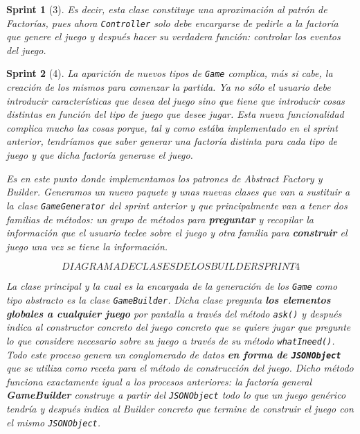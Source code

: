 \documentclass[12pt,a4paper,openright]{book}
\theoremstyle{break}
\newtheorem*{sprint}{Sprint}
\begin{document}
\begin{sprint}[3]
Es decir, esta clase constituye una aproximación al patrón de Factorías, pues ahora \texttt{Controller} solo debe encargarse de pedirle a la factoría que genere el juego y después hacer su verdadera función: controlar los eventos del juego.
\end{sprint}

\begin{sprint}[4]
La aparición de nuevos tipos de \texttt{Game} complica, más si cabe, la creación de los mismos para comenzar la partida. Ya no sólo el usuario debe introducir características que desea del juego sino que tiene que introducir cosas distintas en función del tipo de juego que desee jugar. Esta nueva funcionalidad complica mucho las cosas porque, tal y como estába implementado en el sprint anterior, tendríamos que saber generar una factoría distinta para cada tipo de juego y que dicha factoría generase el juego.

Es en este punto donde implementamos los patrones de \textit{Abstract Factory} y \textit{Builder}. Generamos un nuevo paquete y unas nuevas clases que van a sustituir a la clase \texttt{GameGenerator} del sprint anterior y que principalmente van a tener dos familias de métodos: un grupo de métodos para \textbf{preguntar} y recopilar la información que el usuario teclee sobre el juego y otra familia para \textbf{construir} el juego una vez se tiene la información.

$$DIAGRAMA DE CLASES DE LOS BUILDER SPRINT 4$$

La clase principal y la cual es la encargada de la generación de los \texttt{Game} como tipo abstracto es la clase \texttt{GameBuilder}. Dicha clase pregunta \textbf{los elementos globales a cualquier juego} por pantalla a través del método \texttt{ask()} y después indica al constructor concreto del juego concreto que se quiere jugar que pregunte lo que considere necesario sobre su juego a través de su método \texttt{whatIneed()}. Todo este proceso genera un conglomerado de datos \textbf{en forma de \texttt{JSONObject}} que se utiliza como receta para el método de construcción del juego. Dicho método funciona exactamente igual a los procesos anteriores: la factoría general \textbf{GameBuilder} construye a partir del \texttt{JSONObject} todo lo que un juego genérico tendría y después indica al Builder concreto que termine de construir el juego con el mismo \texttt{JSONObject}.


\end{sprint}
\end{document}
